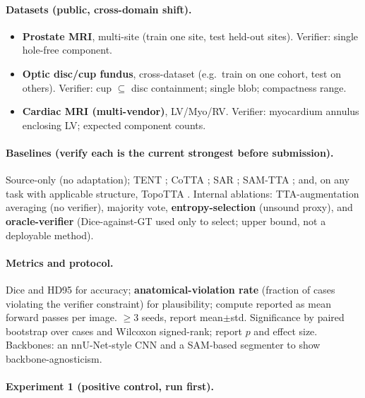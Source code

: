 \documentclass[10pt,twocolumn]{article}
\begin{document}
\paragraph{Datasets (public, cross-domain shift).}
\begin{itemize}\setlength\itemsep{0.15em}
\item \textbf{Prostate MRI}, multi-site (train one site, test held-out sites). Verifier: single hole-free component.
\item \textbf{Optic disc/cup fundus}, cross-dataset (e.g.\ train on one cohort, test on others). Verifier: cup $\subseteq$ disc containment; single blob; compactness range.
\item \textbf{Cardiac MRI (multi-vendor)}, LV/Myo/RV. Verifier: myocardium annulus enclosing LV; expected component counts.
\end{itemize}

\paragraph{Baselines (verify each is the current strongest before submission).} Source-only (no adaptation); TENT \citep{wang2021tent}; CoTTA \citep{wang2022cotta}; SAR \citep{niu2023sar}; SAM-TTA \citep{samtta2026}; and, on any task with applicable structure, TopoTTA \citep{zhou2025topotta}. Internal ablations: TTA-augmentation averaging (no verifier), majority vote, \textbf{entropy-selection} (unsound proxy), and \textbf{oracle-verifier} (Dice-against-GT used only to select; upper bound, not a deployable method).

\paragraph{Metrics and protocol.} Dice and HD95 for accuracy; \textbf{anatomical-violation rate} (fraction of cases violating the verifier constraint) for plausibility; compute reported as mean forward passes per image. $\ge 3$ seeds, report mean$\pm$std. Significance by paired bootstrap over cases \citep{efron1994bootstrap} and Wilcoxon signed-rank; report $p$ and effect size. Backbones: an nnU-Net-style CNN \citep{isensee2021nnunet} and a SAM-based segmenter \citep{kirillov2023sam} to show backbone-agnosticism.

\paragraph{Experiment 1 (positive control, run first).} 
\end{document}
